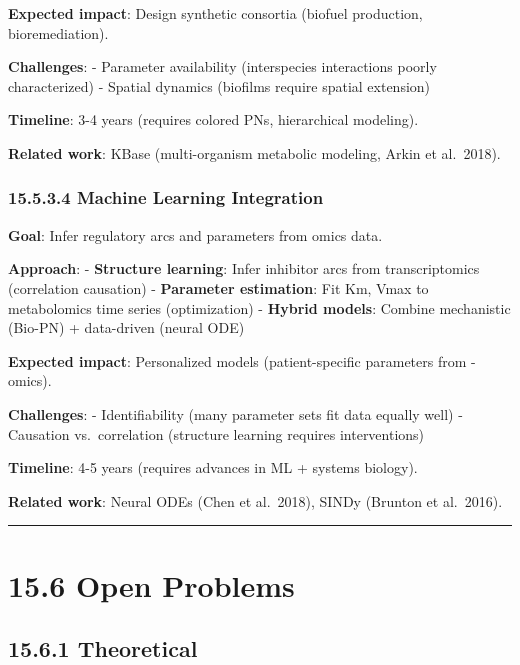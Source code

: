 \textbf{Expected impact}: Design synthetic consortia (biofuel
production, bioremediation).

\textbf{Challenges}: - Parameter availability (interspecies interactions
poorly characterized) - Spatial dynamics (biofilms require spatial
extension)

\textbf{Timeline}: 3-4 years (requires colored PNs, hierarchical
modeling).

\textbf{Related work}: KBase (multi-organism metabolic modeling, Arkin
et al.~2018).

\hypertarget{machine-learning-integration}{%
\subsubsection{15.5.3.4 Machine Learning
Integration}\label{machine-learning-integration}}

\textbf{Goal}: Infer regulatory arcs and parameters from omics data.

\textbf{Approach}: - \textbf{Structure learning}: Infer inhibitor arcs
from transcriptomics (correlation \textrightarrow causation) - \textbf{Parameter
estimation}: Fit Km, Vmax to metabolomics time series (optimization) -
\textbf{Hybrid models}: Combine mechanistic (Bio-PN) + data-driven
(neural ODE)

\textbf{Expected impact}: Personalized models (patient-specific
parameters from -omics).

\textbf{Challenges}: - Identifiability (many parameter sets fit data
equally well) - Causation vs.~correlation (structure learning requires
interventions)

\textbf{Timeline}: 4-5 years (requires advances in ML + systems
biology).

\textbf{Related work}: Neural ODEs (Chen et al.~2018), SINDy (Brunton et
al.~2016).

\begin{center}\rule{0.5\linewidth}{0.5pt}\end{center}

\hypertarget{open-problems}{%
\section{15.6 Open Problems}\label{open-problems}}

\hypertarget{theoretical}{%
\subsection{15.6.1 Theoretical}\label{theoretical}}

